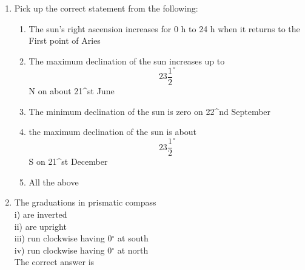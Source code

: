 \documentclass[11pt,a4paper]{article}
\begin{document}
\begin{enumerate}
\item{Pick up the correct statement from the following:}
\begin{enumerate}[label=\Alph*.]
\item{The sun's right ascension increases for 0 h to 24 h when it returns to the First point of Aries}
\item{The maximum declination of the sun increases up to $$23{\frac{1}{2}^ \circ }$$ N on about 21\^{}st June}
\item{The minimum declination of the sun is zero on 22\^{}nd September}
\item{the maximum declination of the sun is about $$23{\frac{1}{2}^ \circ }$$ S on 21\^{}st December}
\item{All the above}
\end{enumerate}
\item{The graduations in prismatic compass \\
i) are inverted \\
ii) are upright \\
iii) run clockwise having 0$^\circ$ at south \\
iv) run clockwise having 0$^\circ$ at north \\
The correct answer is \\

}
\end{enumerate}
\end{document}

